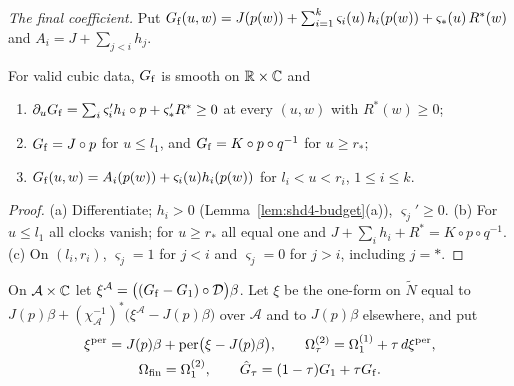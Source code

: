 \emph{The final coefficient.} Put
$G_{\rm f}(u,w)=J(p(w))+\sum_{i=1}^k\varsigma_i(u)\,h_i(p(w))+\varsigma_*(u)\,R^*(w)$ and $A_i=J+\sum_{j<i}h_j$.

\begin{lemma}\label{lem:shd4-Gf}
For valid cubic data, $G_{\rm f}$ is smooth on $\mathbb{R}\times\mathbb{C}$ and
\begin{enumerate}[label=(\alph*)]
\item $\partial_uG_{\rm f}=\sum_i\varsigma_i'h_i\circ p+\varsigma_*'R^*\ge0$ at every $(u,w)$ with $R^*(w)\ge0$;
\item $G_{\rm f}=J\circ p$ for $u\le l_1$, and $G_{\rm f}=K\circ p\circ q^{-1}$ for $u\ge r_*$;
\item $G_{\rm f}(u,w)=A_i(p(w))+\varsigma_i(u)h_i(p(w))$ for $l_i<u<r_i$, $1\le i\le k$.
\end{enumerate}
\end{lemma}

\begin{proof}
(a) Differentiate; $h_i>0$ (Lemma~\ref{lem:shd4-budget}(a)), $\varsigma_j'\ge0$. (b) For $u\le l_1$ all clocks vanish; for $u\ge r_*$ all equal one and $J+\sum_ih_i+R^*=K\circ p\circ q^{-1}$. (c) On $(l_i,r_i)$, $\varsigma_j=1$ for $j<i$ and $\varsigma_j=0$ for $j>i$, including $j=*$.
\end{proof}

\begin{construction}\label{cons:shd4-xi}
On $\mathcal A\times\mathbb{C}$ let $\xi^{\mathcal A}=\bigl((G_{\rm f}-G_1)\circ\mathcal D\bigr)\beta$. Let $\xi$ be the one-form on $\widetilde N$ equal to
$J(p)\beta+(\chi_{\mathcal A}^{-1})^*\bigl(\xi^{\mathcal A}-J(p)\beta\bigr)$ over $\mathcal A$ and to $J(p)\beta$ elsewhere, and put
\[
\begin{gathered}
 \xi^{\rm per}=J(p)\beta+\operatorname{per}\bigl(\xi-J(p)\beta\bigr),\qquad
 \Omega^{(2)}_\tau=\Omega^{(1)}_1+\tau\,d\xi^{\rm per},\\
 \Omega_{\rm fin}=\Omega^{(2)}_1,\qquad \hat G_\tau=(1-\tau)G_1+\tau G_{\rm f}.
\end{gathered}
\]
\end{construction}

